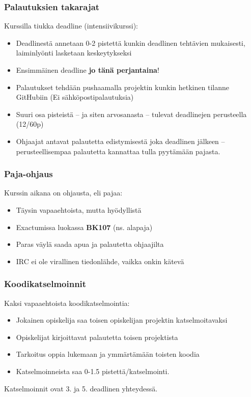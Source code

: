 \documentclass[finnish]{beamer}
\begin{document}
	\begin{frame}
		\frametitle{Palautuksien takarajat}

		Kurssilla tiukka deadline (intensiivikurssi):
		\begin{itemize}
			\item Deadlinestä annetaan 0-2 pistettä kunkin deadlinen tehtävien mukaisesti, laiminlyönti lasketaan keskeytykseksi
			\item Ensimmäinen deadline \textbf{jo tänä perjantaina}!
			\item Palautukset tehdään pushaamalla projektin kunkin hetkinen tilanne GitHubiin (Ei sähköpostipalautuksia)
			\item Suuri osa pisteistä -- ja siten arvosanasta -- tulevat deadlinejen perusteella (12/60p)
			\item Ohjaajat antavat palautetta edistymisestä joka deadlinen jälkeen -- perusteellisempaa palautetta kannattaa tulla pyytämään pajasta.
		\end{itemize}
	\end{frame}
	
	\begin{frame}
		\frametitle{Paja-ohjaus}

		Kurssin aikana on ohjausta, eli pajaa:
		\begin{itemize}
			\item Täysin vapaaehtoista, mutta hyödyllistä
			\item Exactumissa luokassa \textbf{BK107} (ns. alapaja)
			\item Paras väylä saada apua ja palautetta ohjaajilta
			\item IRC ei ole virallinen tiedonlähde, vaikka onkin kätevä
		\end{itemize}
	\end{frame}
	
	\begin{frame}
		\frametitle{Koodikatselmoinnit}
		
		Kaksi vapaaehtoista koodikatselmointia:
		\begin{itemize}
			\item Jokainen opiskelija saa toisen opiskelijan projektin katselmoitavaksi
			\item Opiskelijat kirjoittavat palautetta toisen projektista
			\item Tarkoitus oppia lukemaan ja ymmärtämään toisten koodia
			\item Katselmoinneista saa 0-1.5 pistettä/katselmointi.
		\end{itemize}
		Katselmoinnit ovat 3. ja 5. deadlinen yhteydessä.
	\end{frame}
	
\end{document}
